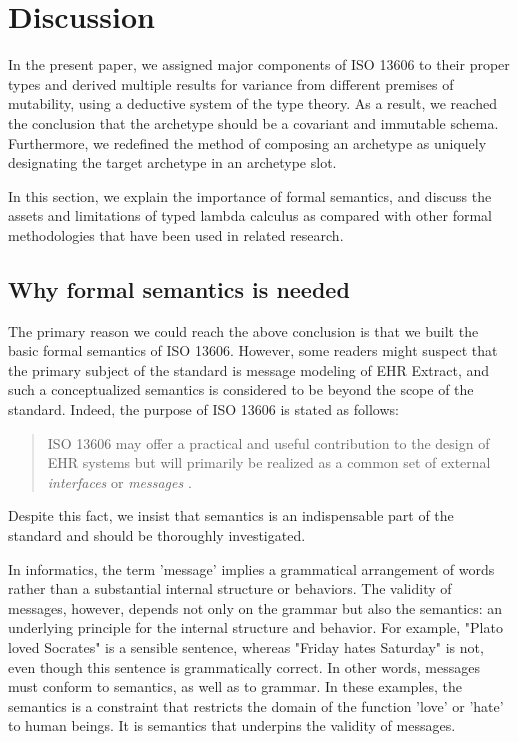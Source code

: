 \documentclass[preprint,3p,onecolumn,times,review]{article}
\begin{document}
{\section{Discussion}

In the present paper, we assigned major components of ISO 13606 to their proper types and derived multiple results for variance from different premises of mutability, using a deductive system of the type theory. As a result, we reached the conclusion that the archetype should be a covariant and immutable schema. Furthermore, we redefined the method of composing an archetype as uniquely designating the target archetype in an archetype slot.

In this section, we explain the importance of formal semantics, and discuss the assets and limitations of typed lambda calculus as compared with other formal methodologies that have been used in related research.

\subsection{Why formal semantics is needed}

The primary reason we could reach the above conclusion is that we built the basic formal semantics of ISO 13606.
However, some readers might suspect that the primary subject of the standard is message modeling of EHR Extract, and such a conceptualized semantics is considered to be beyond the scope of the standard.
Indeed, the purpose of ISO 13606 is stated as follows:
\begin{quote}
  ISO 13606 may offer a practical and useful contribution to the design of EHR systems but will primarily be realized as a common set of external {\it interfaces} or {\it messages} \cite[v]{iso08:13606_healt_elect_part1}.
\end{quote}

Despite this fact, we insist that semantics is an indispensable part of the standard and should be thoroughly investigated.

In informatics, the term 'message' implies a grammatical arrangement of words rather than a substantial internal structure or behaviors. The validity of messages, however, depends not only on the grammar but also the semantics: an underlying principle for the internal structure and behavior. For example, "Plato loved Socrates" is a sensible sentence, whereas "Friday hates Saturday" is not, even though this sentence is grammatically correct. In other words, messages must conform to semantics, as well as to grammar. In these examples, the semantics is a constraint that restricts the domain of the function 'love' or 'hate' to human beings. It is semantics that underpins the validity of messages.

}
\end{document}

